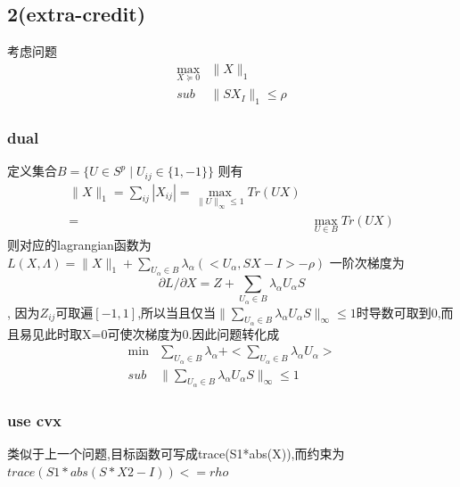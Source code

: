 \documentclass[UTF8]{ctexart}
\begin{document}
\subsection{2(extra-credit)}
考虑问题
\begin{equation}
    \begin{split}
    \max_{X\succeq0}& \|X\|_1 \\
    sub& \|SX_I\|_1\leq \rho
    \end{split}
  \end{equation}
  \subsubsection{dual}
  定义集合$B=\{U\in S^p \mid U_{ij}\in \{1,-1\} \}$
  则有
  \begin{equation}
    \begin{split}
\|X\|_1=\sum_{ij}|X_{ij}|=\max_{\|U\|_{\infty}\leq1}Tr(UX)\\
    = & \max_{U\in B}Tr(UX)
    \end{split}
  \end{equation}
    则对应的lagrangian函数为
    $L(X,\Lambda)=\|X\|_1+\sum_{U_\alpha\in B}\lambda_\alpha(<U_\alpha,SX-I>-\rho)$
    一阶次梯度为
    $$\partial L/\partial X=Z+\sum_{U_\alpha\in B}\lambda_\alpha U_\alpha S$$,
    因为$Z_{ij}$可取遍$[-1,1]$,所以当且仅当$\|\sum_{U_\alpha\in B}\lambda_\alpha U_\alpha S\|_{\infty}\leq 1$时导数可取到0,而且易见此时取X=0可使次梯度为0.因此问题转化成
    \begin{equation}
    \begin{split}
    \min& \sum_{U_\alpha\in B}\lambda_\alpha + <\sum_{U_\alpha\in B}\lambda_\alpha U_\alpha>  \\
    sub& \|\sum_{U_\alpha\in B}\lambda_\alpha U_\alpha S\|_{\infty}\leq 1
    \end{split}
  \end{equation}
    \subsubsection{use cvx}
    类似于上一个问题,目标函数可写成trace(S1*abs(X)),而约束为$trace(S1*abs(S*X2-I)) <= rho$
  
    
  
\end{document}
